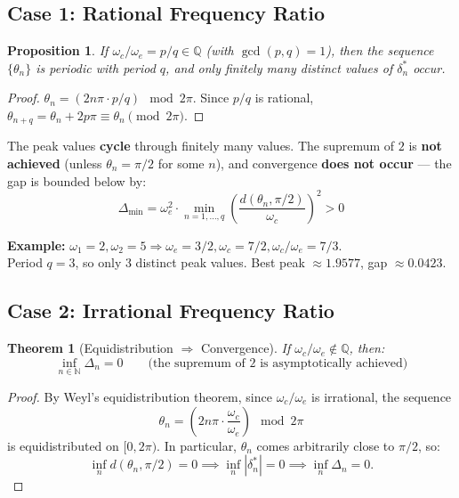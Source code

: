 \documentclass[12pt]{article}
\newtheorem{theorem}{Theorem}
\newtheorem{proposition}{Proposition}
\theoremstyle{definition}
\theoremstyle{remark}
\begin{document}
\subsection{Case 1: Rational Frequency Ratio}

\begin{proposition}
If $\omega_c / \omega_e = p/q \in \mathbb{Q}$ (with $\gcd(p,q)=1$), then the sequence $\{\theta_n\}$ is periodic with period $q$, and only finitely many distinct values of $\delta_n^*$ occur.
\end{proposition}

\begin{proof}
$\theta_n = (2n\pi \cdot p/q) \mod 2\pi$. Since $p/q$ is rational, $\theta_{n+q} = \theta_n + 2p\pi \equiv \theta_n \pmod{2\pi}$.
\end{proof}

\begin{tcolorbox}[colback=red!5, colframe=red!50!black, title=Rational Case]
The peak values \textbf{cycle} through finitely many values. The supremum of $2$ is \textbf{not achieved} (unless $\theta_n = \pi/2$ for some $n$), and convergence \textbf{does not occur} --- the gap is bounded below by:
\[
\Delta_{\min} = \omega_e^2 \cdot \min_{n=1,\ldots,q}\left(\frac{d(\theta_n, \pi/2)}{\omega_c}\right)^2 > 0
\]
\end{tcolorbox}

\textbf{Example:} $\omega_1=2, \omega_2=5 \Rightarrow \omega_e=3/2, \omega_c=7/2, \omega_c/\omega_e = 7/3$.\\
Period $q=3$, so only 3 distinct peak values. Best peak $\approx 1.9577$, gap $\approx 0.0423$.

\subsection{Case 2: Irrational Frequency Ratio}

\begin{theorem}[Equidistribution $\Rightarrow$ Convergence]
If $\omega_c / \omega_e \notin \mathbb{Q}$, then:
\[
\inf_{n \in \mathbb{N}} \Delta_n = 0 \qquad\text{(the supremum of $2$ is asymptotically achieved)}
\]
\end{theorem}

\begin{proof}
By Weyl's equidistribution theorem, since $\omega_c/\omega_e$ is irrational, the sequence
\[
\theta_n = \left(2n\pi \cdot \frac{\omega_c}{\omega_e}\right) \mod 2\pi
\]
is equidistributed on $[0, 2\pi)$. In particular, $\theta_n$ comes arbitrarily close to $\pi/2$, so:
\[
\inf_{n} d(\theta_n, \pi/2) = 0 \implies \inf_n |\delta_n^*| = 0 \implies \inf_n \Delta_n = 0.
\]
\end{proof}
\end{document}
